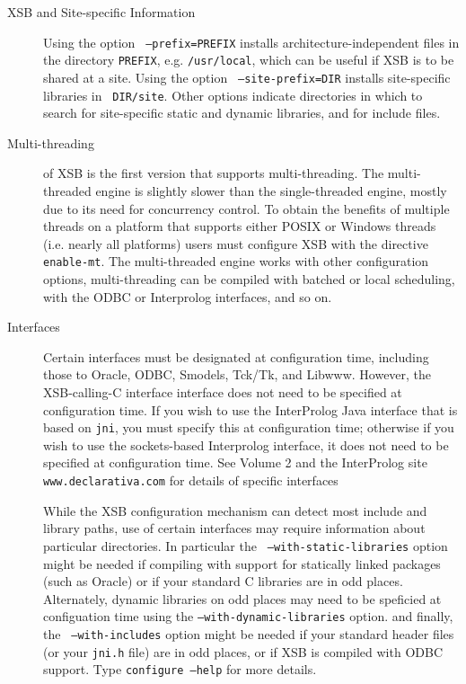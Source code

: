 \begin{description}
\item[XSB and Site-specific Information] Using the option {\tt
  --prefix=PREFIX} installs architecture-independent files in the
  directory {\tt PREFIX}, e.g. {\tt /usr/local}, which can be useful
  if XSB is to be shared at a site.  Using the option {\tt
    --site-prefix=DIR} installs site-specific libraries in {\tt
    DIR/site}.  Other options indicate directories in which to search
  for site-specific static and dynamic libraries, and for include
  files.

\item[Multi-threading] \version{} of XSB is the first version that
  supports multi-threading.  The multi-threaded engine is slightly
  slower than the single-threaded engine, mostly due to its need for
  concurrency control.  To obtain the benefits of multiple threads on
  a platform that supports either POSIX or Windows threads (i.e.
  nearly all platforms) users must configure XSB with the directive
  {\tt enable-mt}.  The multi-threaded engine works with other
  configuration options, multi-threading can be compiled with batched
  or local scheduling, with the ODBC or Interprolog interfaces, and so
  on.


\item[Interfaces] Certain interfaces must be designated at
configuration time, including those to Oracle, ODBC, Smodels, Tck/Tk,
and Libwww.  However, the XSB-calling-C interface interface does not
need to be specified at configuration time.  If you wish to use the
InterProlog Java interface that is based on {\tt jni}, you must
specify this at configuration time; otherwise if you wish to use the
sockets-based Interprolog interface, it does not need to be specified
at configuration time.  See Volume 2 and the InterProlog site {\tt
www.declarativa.com} for details of specific interfaces

While the XSB configuration mechanism can detect most include and
library paths, use of certain interfaces may require information about
particular directories.  In particular the {\tt
--with-static-libraries} option might be needed if compiling with
support for statically linked packages (such as Oracle) or if your
standard C libraries are in odd places. Alternately, dynamic libraries
on odd places may need to be speficied at configuation time using the
{\tt --with-dynamic-libraries} option.  and finally, the {\tt
--with-includes} option might be needed if your standard header files
(or your {\tt jni.h} file) are in odd places, or if XSB is compiled
with ODBC support.  Type {\tt configure --help} for more details.


\end{description}
